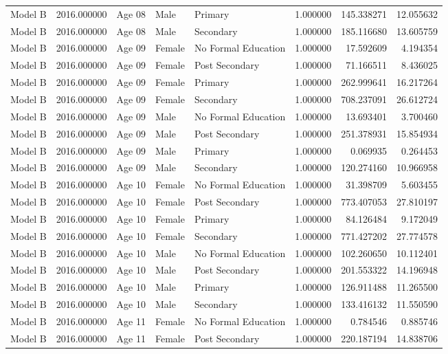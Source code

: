 \begin{table}[ht]
\begin{tabular}{lrlllrrr}
Model B & 2016.000000 & Age 08 & Male & Primary & 1.000000 & 145.338271 & 12.055632 \\
Model B & 2016.000000 & Age 08 & Male & Secondary & 1.000000 & 185.116680 & 13.605759 \\
Model B & 2016.000000 & Age 09 & Female & No Formal Education & 1.000000 & 17.592609 & 4.194354 \\
Model B & 2016.000000 & Age 09 & Female & Post Secondary & 1.000000 & 71.166511 & 8.436025 \\
Model B & 2016.000000 & Age 09 & Female & Primary & 1.000000 & 262.999641 & 16.217264 \\
Model B & 2016.000000 & Age 09 & Female & Secondary & 1.000000 & 708.237091 & 26.612724 \\
Model B & 2016.000000 & Age 09 & Male & No Formal Education & 1.000000 & 13.693401 & 3.700460 \\
Model B & 2016.000000 & Age 09 & Male & Post Secondary & 1.000000 & 251.378931 & 15.854934 \\
Model B & 2016.000000 & Age 09 & Male & Primary & 1.000000 & 0.069935 & 0.264453 \\
Model B & 2016.000000 & Age 09 & Male & Secondary & 1.000000 & 120.274160 & 10.966958 \\
Model B & 2016.000000 & Age 10 & Female & No Formal Education & 1.000000 & 31.398709 & 5.603455 \\
Model B & 2016.000000 & Age 10 & Female & Post Secondary & 1.000000 & 773.407053 & 27.810197 \\
Model B & 2016.000000 & Age 10 & Female & Primary & 1.000000 & 84.126484 & 9.172049 \\
Model B & 2016.000000 & Age 10 & Female & Secondary & 1.000000 & 771.427202 & 27.774578 \\
Model B & 2016.000000 & Age 10 & Male & No Formal Education & 1.000000 & 102.260650 & 10.112401 \\
Model B & 2016.000000 & Age 10 & Male & Post Secondary & 1.000000 & 201.553322 & 14.196948 \\
Model B & 2016.000000 & Age 10 & Male & Primary & 1.000000 & 126.911488 & 11.265500 \\
Model B & 2016.000000 & Age 10 & Male & Secondary & 1.000000 & 133.416132 & 11.550590 \\
Model B & 2016.000000 & Age 11 & Female & No Formal Education & 1.000000 & 0.784546 & 0.885746 \\
Model B & 2016.000000 & Age 11 & Female & Post Secondary & 1.000000 & 220.187194 & 14.838706 \\

\end{tabular}
\end{table}
